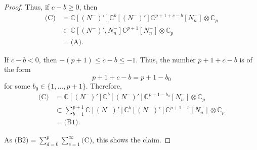 \documentclass[reqno,11pt]{amsart}
\theoremstyle{remark}
\theoremstyle{definition}
\numberwithin{equation}{section}
\newcommand{\C}{\mathbb{C}}
\newcommand{\Np}{(N^-)'}
\newcommand{\Nn}{N_n^-}
\begin{document}
\begin{proof}
\noindent
Thus, if $c-b\geq 0$, then
\begin{align*}
\text{(C)}
&=\C[\Np]\C^{b}[\Np]\C^{p+1+c-b}[\Nn]\otimes \C_p\\
&\subset\C[\Np,\Nn]\C^{p+1}[\Nn]\otimes \C_p\\
&=\text{(A)}.
\end{align*}

\noindent
If $c-b < 0$, then $-(p+1) \leq c-b \leq -1$. Thus,
the number $p+1+c-b$ is of the form
\begin{equation*}
p+1+c-b = p+1-b_0
\end{equation*}
for some $b_0 \in \{1,\ldots, p+1\}$. Therefore,
\begin{align*}
\text{(C)}
&=\C[\Np]\C^{b}[\Np]\C^{p+1-b_0}[\Nn]\otimes \C_p\\
&\subset 
\sum_{b=1}^{p+1}\C[\Np]\C^{b}[\Np]\C^{p+1-b}[\Nn]\otimes \C_p\\
&=\text{(B1)}.
\end{align*}

\noindent
As $\text{(B2)} = \sum_{d=0}^p\sum_{c=1}^\infty \text{(C)}$, this shows the claim.
\end{proof}
\end{document}
